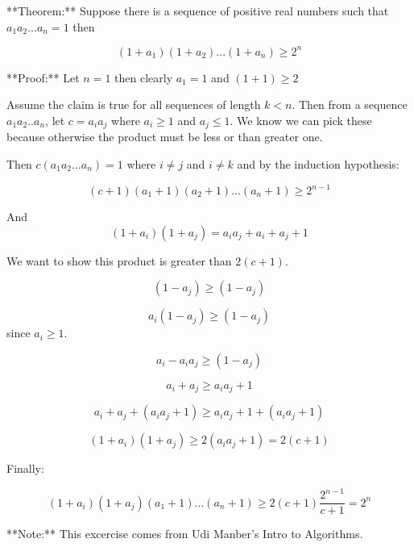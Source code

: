 **Theorem:** Suppose there is a sequence of positive real numbers such that $a_{1}a_{2}... a_{n}=1$ then 

$$(1+a_{1})(1+a_{2})...(1+a_{n})\geq2^{n}$$

**Proof:** Let $n=1$ then clearly $a_{1}=1$ and $(1+1)\geq2$

Assume the claim is true for all sequences of length $k<n$. Then from a sequence $a_{1}a_{2}..a_{n}$, let $c=a_{i}a_{j}$ where $a_{i}\geq1$ and $a_{j}\leq1$. We know we can pick these because otherwise the product must be less or than greater one.

Then $c(a_{1}a_{2}...a_{n})= 1$ where $i\neq j$ and $i\neq k$ and by the induction hypothesis:

$$(c+1)(a_{1}+1)(a_{2}+1)...(a_{n}+1)\geq 2^{n-1}$$

And  
$$(1+a_{i})(1+a_{j})=a_{i}a_{j}+a_{i}+a_{j}+1$$

We want to show this product is greater than $2(c+1)$.

$$(1-a_{j})\geq (1-a_{j})$$

$$a_{i}(1-a_{j})\geq (1-a_{j})$$ since $a_{i}\geq 1$.

$$a_{i}-a_{i}a_{j}\geq (1-a_{j})$$

$$a_{i} + a_{j} \geq a_{i}a_{j} + 1$$

$$a_{i} + a_{j} + (a_{i}a_{j} + 1) \geq a_{i}a_{j} + 1 + (a_{i}a_{j} + 1)$$

$$(1+a_{i})(1+a_{j}) \geq 2(a_{i}a_{j} + 1) = 2(c+1)$$

Finally:

$$(1+a_{i})(1+a_{j})(a_{1}+1)...(a_{n}+1)\geq 2(c+1)\frac{2^{n-1}}{c+1}=2^{n}$$


**Note:** This excercise comes from Udi Manber's Intro to Algorithms.
